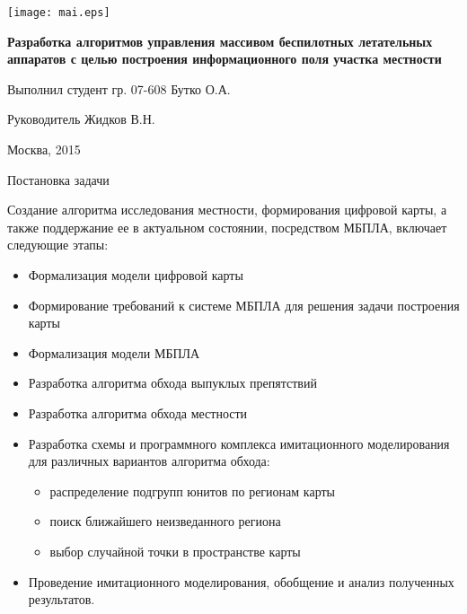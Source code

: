 



\begin{cslide}
    \texttt{[image: mai.eps]}

    \large\textbf{ Разработка алгоритмов управления
    массивом беспилотных летательных аппаратов
    с целью построения информационного поля
    участка местности}

    \vfill

    \begin{flushright}
    \small Выполнил студент гр. 07-608 Бутко О.А.

    \small Руководитель Жидков В.Н.
    \end{flushright}

    \vfill

    \small Москва, 2015
\end{cslide}

\begin{tslide}{Постановка задачи}

Создание алгоритма исследования местности,
формирования цифровой карты, а также поддержание
ее в актуальном состоянии, посредством МБПЛА,
включает следующие этапы:
\begin{itemize}
\item Формализация модели цифровой карты
\item Формирование требований к системе МБПЛА для решения задачи построения карты
\item Формализация модели МБПЛА
\item Разработка алгоритма обхода выпуклых препятствий
\item Разработка алгоритма обхода местности
\item Разработка схемы и программного комплекса имитационного моделирования для различных вариантов алгоритма обхода:
    \begin{itemize}
    \item распределение подгрупп юнитов по регионам карты
    \item поиск ближайшего неизведанного региона
    \item выбор случайной точки в пространстве карты
    \end{itemize}
\item Проведение имитационного моделирования, обобщение и анализ полученных результатов.
\end{itemize}

\end{tslide}

